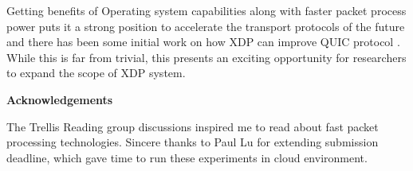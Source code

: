 \documentclass[12pt,titlepage]{article}
\begin{document}
Getting benefits of Operating system capabilities  along with faster packet process power puts it a strong position to accelerate the transport protocols of the future and there has been some initial work on how XDP can improve QUIC protocol \cite{eQUIC}. While this is far from trivial, this presents an exciting opportunity for researchers to expand the scope of XDP system.

\vspace{4cm}

\begin{center}
    \textbf{Acknowledgements}
    \vspace{0.5cm}
    
    The Trellis Reading group discussions inspired me to read about fast packet processing technologies. Sincere thanks to Paul Lu for extending submission deadline, which gave time to  run these experiments in cloud environment.
    \begin{minipage}{0.8\linewidth}
    \end{minipage}
    \noindent\ignorespaces
\end{center}

\vspace{4cm}


\begin{spacing}{1}


\end{spacing}
\end{document}
